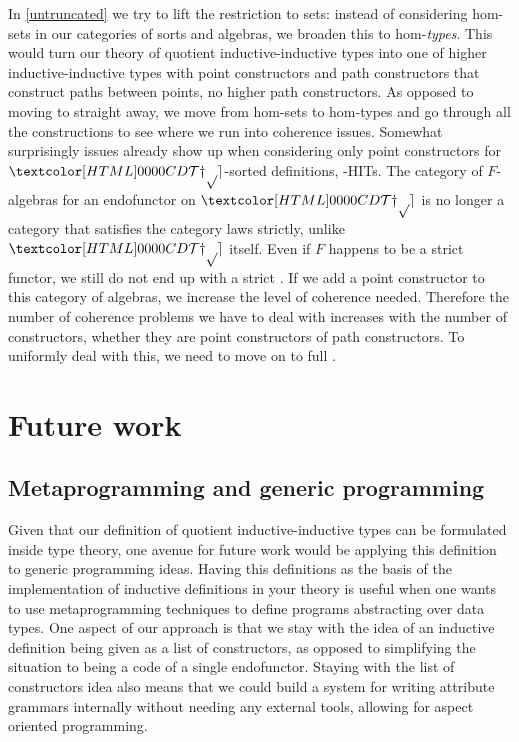 In \cref{untruncated} we try to lift the restriction to sets: instead
of considering hom-sets in our categories of sorts and algebras, we
broaden this to hom-\emph{types}. This would turn our theory of
quotient inductive-inductive types into one of higher
inductive-inductive types with point constructors and path
constructors that construct paths between points, \ie no higher path
constructors. As opposed to moving to \inftycats straight away, we
move from hom-sets to hom-types and go through all the constructions
to see where we run into coherence issues. Somewhat surprisingly
issues already show up when considering only point constructors for
$\TYPE$-sorted definitions, -HITs. The category of $F$-algebras
for an endofunctor on $\TYPE$ is no longer a category that satisfies
the category laws strictly, unlike $\TYPE$ itself. Even if $F$ happens
to be a strict functor, we still do not end up with a strict
\inftycat. If we add a point constructor to this category of algebras,
we increase the level of coherence needed. Therefore the number of
coherence problems we have to deal with increases with the number of
constructors, whether they are point constructors of path
constructors. To uniformly deal with this, we need to move on to full
\inftycats.

\section{Future work}

\subsection{Metaprogramming and generic programming}

Given that our definition of quotient inductive-inductive types can be
formulated inside type theory, one avenue for future work would be
applying this definition to generic programming ideas. Having this
definitions as the basis of the implementation of inductive
definitions in your theory is useful when one wants to use
metaprogramming techniques to define programs abstracting over data
types. One aspect of our approach is that we stay with the idea of an
inductive definition being given as a list of constructors, as opposed
to simplifying the situation to being a code of a single
endofunctor. Staying with the list of constructors idea also means
that we could build a system for writing attribute grammars internally
without needing any external tools, allowing for aspect oriented
programming.

